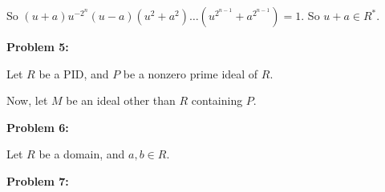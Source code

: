 \documentclass[a4paper,12pt]{article}
\newcommand{\shunt}{\vspace{20mm}}
\begin{document}
So $(u+a)u^{-2^n}(u-a)(u^2+a^2)\ldots(u^{2^{n-1}}+a^{2^{n-1}})=1$. So $u+a \in R^*$.

\shunt

{\bf Problem 5:}

Let $R$ be a PID, and $P$ be a nonzero prime ideal of $R$.

Now, let $M$ be an ideal other than $R$ containing $P$. %

\shunt

{\bf Problem 6:}

Let $R$ be a domain, and $a, b \in R$. %

\shunt

{\bf Problem 7:}

\shunt
\end{document}
